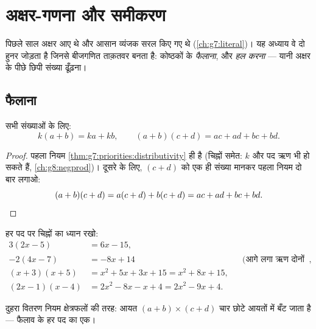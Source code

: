 \chapter{अक्षर-गणना और समीकरण}\label{ch:g8:equations}

पिछले साल अक्षर आए थे और आसान व्यंजक सरल किए गए थे
(\cref{ch:g7:literal})। यह अध्याय वे दो हुनर जोड़ता है जिनसे
बीजगणित ताक़तवर बनता है: कोष्ठकों के  \emph{फैलाना}, और
\emph{ हल करना} --- यानी अक्षर के पीछे छिपी संख्या ढूँढ़ना।

\section{फैलाना}

\begin{theorem}[सादा और दुहरा वितरण नियम]\label{thm:g8:equations:expand}
सभी संख्याओं के लिए:
\[
k(a + b) = ka + kb,
\qquad
(a + b)(c + d) = ac + ad + bc + bd .
\]
\end{theorem}

\begin{proof}
पहला नियम \cref{thm:g7:priorities:distributivity} ही है (चिह्नों
समेत: $k$ और पद ऋण भी हो सकते हैं, \cref{ch:g8:negprod})। दूसरे के
लिए, $(c + d)$ को एक ही संख्या मानकर पहला नियम दो बार लगाओ:
\[
(a + b)(c + d) = a(c + d) + b(c + d) = ac + ad + bc + bd .
\qedhere
\]
\end{proof}

\begin{example}\label{ex:g8:equations:expand}
हर पद पर चिह्नों का ध्यान रखो:
\begin{align*}
3(2x - 5) &= 6x - 15, \\
-2(4x - 7) &= -8x + 14
&& \text{(आगे लगा ऋण दोनों चिह्न पलट देता है)}, \\
(x + 3)(x + 5) &= x^2 + 5x + 3x + 15 = x^2 + 8x + 15, \\
(2x - 1)(x - 4) &= 2x^2 - 8x - x + 4 = 2x^2 - 9x + 4 .
\end{align*}
\end{example}

\begin{omfigure}

{\small दुहरा वितरण नियम क्षेत्रफलों की तरह: आयत
$(a+b) \times (c+d)$ चार छोटे आयतों में बँट जाता है --- फैलाव के
हर पद का एक।}
\end{omfigure}

